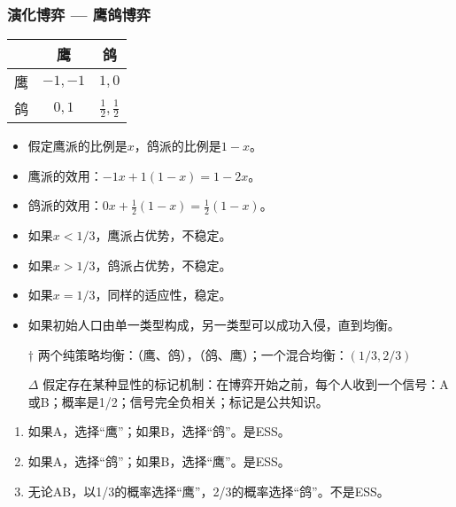\documentclass[UTF8,11pt,colorlinks,compress,openany]{beamer}%
\begin{document}
\begin{frame}\frametitle{演化博弈 --- 鹰鸽博弈}
\begin{table}
\begin{tabu}{c|c|c}
\hline
& 鹰 & 鸽 \\
\hline
鹰 & $-1,-1$ & $1,0$ \\
鸽 & $0,1$ & $\frac{1}{2},\frac{1}{2}$ \\
\hline
\end{tabu}
\end{table}
\begin{itemize}
	\item 假定鹰派的比例是$x$，鸽派的比例是$1-x$。
	\item 鹰派的效用：$-1x+1(1-x)=1-2x$。
	\item 鸽派的效用：$0x+\frac{1}{2}(1-x)=\frac{1}{2}(1-x)$。
	\item 如果$x<1/3$，鹰派占优势，不稳定。
	\item 如果$x>1/3$，鸽派占优势，不稳定。
	\item 如果$x=1/3$，同样的适应性，稳定。
	\item 如果初始人口由单一类型构成，另一类型可以成功入侵，直到均衡。
\end{itemize}
\begin{itemize}
	\item[$\dagger$] 两个纯策略均衡：（鹰、鸽），（鸽、鹰）；一个混合均衡：$(1/3,2/3)$
	\item[$\Delta$] 假定存在某种显性的标记机制：在博弈开始之前，每个人收到一个信号：A或B；概率是1/2；信号完全负相关；标记是公共知识。
\end{itemize}
\begin{enumerate}
	\item 如果A，选择“鹰”；如果B，选择“鸽”。是ESS。
	\item 如果A，选择“鸽”；如果B，选择“鹰”。是ESS。
	\item 无论AB，以1/3的概率选择“鹰”，2/3的概率选择“鸽”。不是ESS。
\end{enumerate}
\end{frame}
\end{document}
